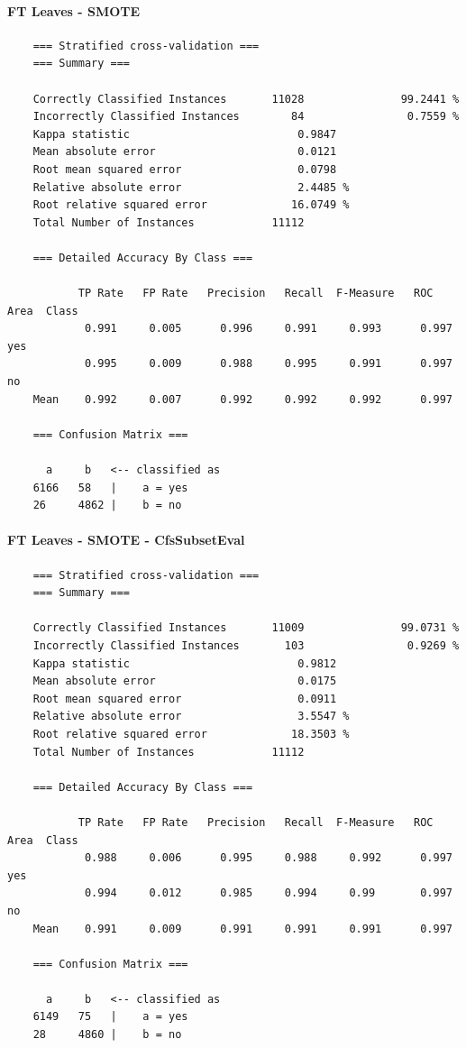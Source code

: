 \paragraph{FT Leaves - SMOTE}
{\footnotesize
	\begin{verbatim}
	=== Stratified cross-validation ===
	=== Summary ===
	
	Correctly Classified Instances       11028               99.2441 %
	Incorrectly Classified Instances        84                0.7559 %
	Kappa statistic                          0.9847
	Mean absolute error                      0.0121
	Root mean squared error                  0.0798
	Relative absolute error                  2.4485 %
	Root relative squared error             16.0749 %
	Total Number of Instances            11112     
	
	=== Detailed Accuracy By Class ===
	
	       TP Rate   FP Rate   Precision   Recall  F-Measure   ROC Area  Class
	        0.991     0.005      0.996     0.991     0.993      0.997    yes
	        0.995     0.009      0.988     0.995     0.991      0.997    no
	Mean    0.992     0.007      0.992     0.992     0.992      0.997
	
	=== Confusion Matrix ===
	
	  a     b   <-- classified as
	6166   58   |    a = yes
	26     4862 |    b = no
	\end{verbatim}
}

\paragraph{FT Leaves - SMOTE - CfsSubsetEval}
{\footnotesize
	\begin{verbatim}
	=== Stratified cross-validation ===
	=== Summary ===
	
	Correctly Classified Instances       11009               99.0731 %
	Incorrectly Classified Instances       103                0.9269 %
	Kappa statistic                          0.9812
	Mean absolute error                      0.0175
	Root mean squared error                  0.0911
	Relative absolute error                  3.5547 %
	Root relative squared error             18.3503 %
	Total Number of Instances            11112     
	
	=== Detailed Accuracy By Class ===
	
	       TP Rate   FP Rate   Precision   Recall  F-Measure   ROC Area  Class
	        0.988     0.006      0.995     0.988     0.992      0.997    yes
	        0.994     0.012      0.985     0.994     0.99       0.997    no
	Mean    0.991     0.009      0.991     0.991     0.991      0.997
	
	=== Confusion Matrix ===
	
	  a     b   <-- classified as
	6149   75   |    a = yes
	28     4860 |    b = no	
	\end{verbatim}
}


